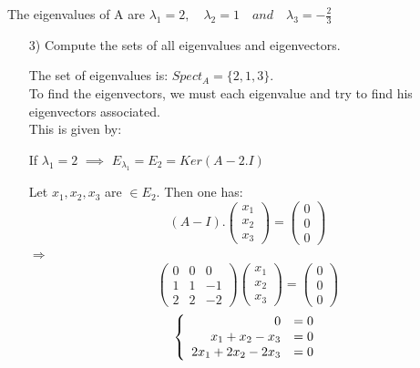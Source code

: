 \documentclass[12pt,a4paper]{article}
\begin{document}
The eigenvalues of A are $\lambda_{1} = 2, \quad \lambda_{2} = 1 \quad and \quad \lambda_{3} = -\frac{2}{3}$
\begin{enumerate}
	\item[3)] Compute the sets of all eigenvalues and eigenvectors.
	
	The set of eigenvalues is: $Spect_{A} = \{2,1,3\}$. \\
	To find the eigenvectors, we must each eigenvalue and try to find his eigenvectors associated.\\ This is given by: 
	
	If $\lambda_{1} = 2$ $\implies$ $E_{\lambda_{1}} = E_2 = Ker(A-2.I)$ 
	
	Let $x_1, x_2, x_3$ are $\in E_{2}$. Then one has:
	\[
	\left(A-I\right).\begin{pmatrix}
	x_{1}\\
	x_{2}\\
	x_{3}
	\end{pmatrix}
	= \begin{pmatrix}
	0\\
	0\\
	0
	\end{pmatrix}
	\] \quad $ \Rightarrow$\[
	\begin{pmatrix}
	0 & 0 & 0\\
	1 & 1 & -1\\
	2 & 2 & -2
	\end{pmatrix}
	\begin{pmatrix}
	x_{1}\\
	x_{2}\\
	x_{3}
	\end{pmatrix}
	= \begin{pmatrix}
	0\\
	0\\
	0
	\end{pmatrix}
	\]
	\[
	\left\{
	\begin{array}{r c l}
	0 &= 0 \\
	x_1 + x_2 - x_3 &= 0 \\
	2x_1 + 2x_2 - 2x_3 &= 0
	\end{array}
	\right.
	\]
\end{enumerate}
















%
\end{document}
